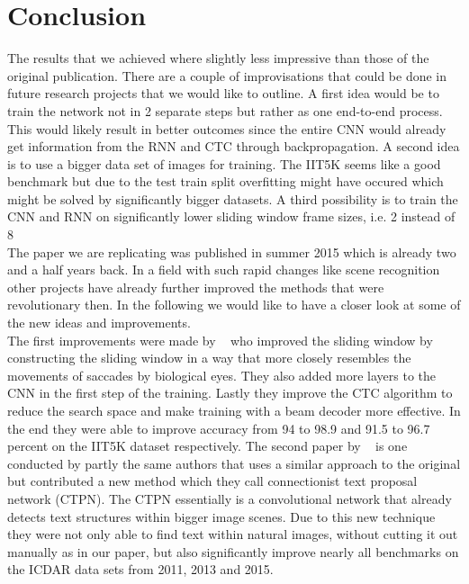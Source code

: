 \documentclass{utue} %
\begin{document}
\section{Conclusion}
The results that we achieved where slightly less impressive than those of the original publication. There are a couple of improvisations that could be done in future research projects that we would like to outline. A first idea would be to train the network not in 2 separate steps but rather as one end-to-end process. This would likely result in better outcomes since the entire CNN would already get information from the RNN and CTC through backpropagation. A second idea is to use a bigger data set of images for training. The IIT5K seems like a good benchmark but due to the test train split overfitting might have occured which might be solved by significantly bigger datasets. A third possibility is to train the CNN and RNN on significantly lower sliding window frame sizes, i.e. 2 instead of 8 %
\\
The paper we are replicating was published in summer 2015 which is already two and a half years back. In a field with such rapid changes like scene recognition other projects have already further improved the methods that were revolutionary then. In the following we would like to have a closer look at some of the new ideas and improvements. \\
The first improvements were made by ~\cite{DBLP:journals/corr/abs-1709-01727} who improved the sliding window by constructing the sliding window in a way that more closely resembles the movements of saccades by biological eyes. They also added more layers to the CNN in the first step of the training. Lastly they improve the CTC algorithm to reduce the search space and make training with a beam decoder more effective. In the end they were able to improve accuracy from 94 to 98.9 and 91.5 to 96.7 percent on the IIT5K dataset respectively. 
The second paper by ~\cite{DBLP:journals/corr/TianHHH016} is one conducted by partly the same authors that uses a similar approach to the original but contributed a new method which they call connectionist text proposal network (CTPN). The CTPN essentially is a convolutional network that already detects text structures within bigger image scenes. Due to this new technique they were not only able to find text within natural images, without cutting it out manually as in our paper, but also significantly improve nearly all benchmarks on the ICDAR data sets from 2011, 2013 and 2015.
\end{document}
